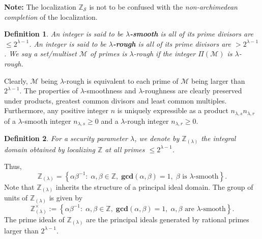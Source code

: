\documentclass[11pt, lettersize, notitlepage, leqno, footskip=0.6cm]{article}
\newcommand{\bz}{\mathbb Z}
\newcommand{\mc}{\mathcal}
\newcommand{\mbf}{\mathbf}
\newcommand{\al}{\alpha}
\newcommand{\be}{\beta}
\newcommand{\lam}{\lambda}
\newcommand{\lamb}{\lambda}
\newcommand{\bzlam}{\bz_{(\lam)}}
\newcommand{\mcM}{\mc{M}}
\newcommand{\vs}{\vspace{-0.15cm}}
\newcommand{\noin}{\noindent}
\newcommand{\GCD}{\mbf{gcd}}
\newtheorem{Def}{Definition}[section]
\numberwithin{equation}{section}
\begin{document}
\noin \textbf{Note:} The localization $\bz_{\mc{S}}$ is not to be confused with the \textit{non-archimedean completion} of the localization.


\begin{Def} An integer is said to be \textbf{$\lamb$-smooth} is all of its prime divisors are $\leq 2^{\lamb-1}$. An integer is said to be \textbf{$\lamb$-rough} is all of its prime divisors are $> 2^{\lam-1}$. We say a set/multiset $\mcM$ of primes is $\lam$-rough if the integer $\Pi(\mcM)$ is $\lam$-rough. \end{Def}

Clearly, $\mcM$ being $\lam$-rough is equivalent to each prime of $\mcM$ being larger than $2^{\lam-1}$. The properties of $\lamb$-smoothness and $\lamb$-roughness are clearly preserved under products, greatest common divisors and least common multiples. Furthermore, any positive integer $n$ is uniquely expressible as a product $n_{{\lam,s}}n_{{\lam,r}}$ of a $\lam$-smooth integer $n_{{\lam,s}}\geq 0$ and a $\lam$-rough integer $n_{{\lam,r}}\geq 0$.

\begin{Def} For a security parameter $\lam$, we denote by $\bz_{(\lamb)}$ the integral domain obtained by localizing $\bz$ at all primes $\leq 2^{\lamb-1}$. \end{Def}

\noin Thus, \vs $$\bz_{(\lamb)} = \left\{{\al}{\be}^{-1}:\; \al,\be\in\bz,\;\GCD(\al,\be) = 1,\; \be \text{ is } \lamb\text{-smooth}\right\}.$$ Note that $\bz_{(\lamb)}$ inherits the structure of a principal ideal domain. The group of units of $\bzlam$ is given by $$\bzlam^{\times} := \left\{{\al}{\be}^{-1}:\; \al,\be\in\bz,\;\GCD(\al,\be) = 1,\; \al, \be \text{ are } \lamb\text{-smooth}\right\}. $$ The prime ideals of $\bz_{(\lamb)}$ are the principal ideals generated by rational primes larger than $2^{\lam-1}$.
\end{document}
